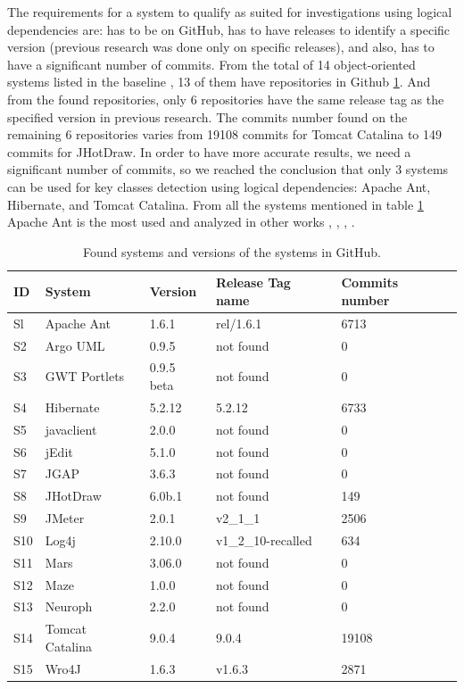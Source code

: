 \documentclass[runningheads]{comsis2}
\begin{document}
The requirements for a system to qualify as suited for investigations using logical dependencies are: has to be on GitHub, has to have releases to identify a specific version (previous research was done only on specific releases), and also, has to have a significant number of commits. 
From the total of 14 object-oriented systems listed in the baseline \cite{Finding-key-classes}, 13 of them have repositories in Github \ref{tab:gitfoundsystems}. And from the found repositories, only 6 repositories have the same release tag as the specified version in previous research.
The commits number found on the remaining 6 repositories varies from 19108 commits for Tomcat Catalina to 149 commits for JHotDraw. In order to have more accurate results, we need a significant number of commits, so we reached the conclusion that only 3 systems can be used for key classes detection using logical dependencies: Apache Ant, Hibernate, and Tomcat Catalina.  From all the systems mentioned in table \ref{tab:gitfoundsystems} Apache Ant is the most used and analyzed in other  works \cite{enase19}, \cite{7332515}, \cite{1402122}, \cite{Kamran2016IdentificationOC}.


\begin{table}
\renewcommand{\arraystretch}{1}
\caption{Found systems and versions of the systems in GitHub. }
\label{tab:gitfoundsystems}
\centering
\begin{tabular}{lllll}
\hline
ID	&	System	&	Version	&	Release Tag name	&	Commits number	\\
\hline
Sl	&	Apache Ant	&	1.6.1	&	rel/1.6.1	&	6713	\\
S2	&	Argo UML	&	0.9.5	&	not found	&	0	\\
S3	&	GWT Portlets	&	0.9.5 beta	&	not found	&	0	\\
S4	&	Hibernate 	&	5.2.12	&	5.2.12	&	6733	\\
S5	&	javaclient	&	2.0.0	&	not found	&	0	\\
S6	&	jEdit	&	5.1.0	&	not found	&	0	\\
S7	&	JGAP	&	3.6.3	&	not found	&	0	\\
S8	&	JHotDraw	&	6.0b.1	&	not found	&	149	\\
S9	&	JMeter	&	2.0.1	&	v2\_1\_1	&	2506	\\
S10	&	Log4j	&	2.10.0	&	v1\_2\_10-recalled	&	634	\\
S11	&	Mars	&	3.06.0	&	not found	&	0	\\
S12	&	Maze	&	1.0.0	&	not found	&	0	\\
S13	&	Neuroph	&	2.2.0	&	not found	&	0	\\
S14	&	Tomcat Catalina	&	9.0.4	&	9.0.4	&	19108	\\
S15	&	Wro4J	&	1.6.3	&	v1.6.3	&	2871	\\
\hline
\end{tabular}
\end{table}
\end{document}
